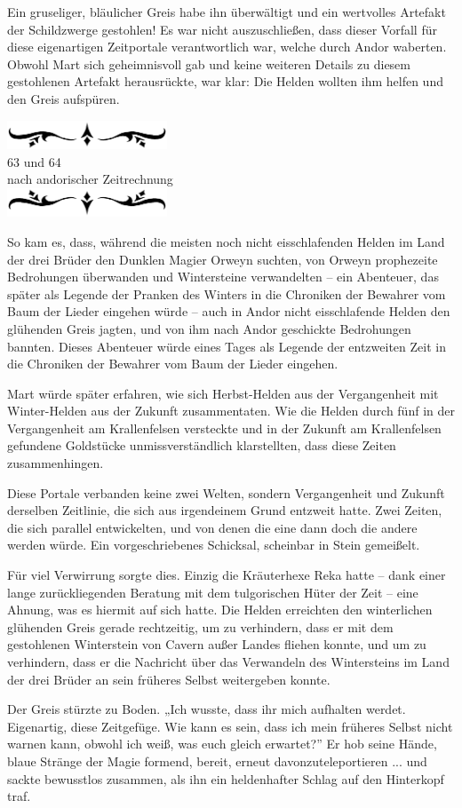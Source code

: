 \documentclass[10pt, a4paper, oneside]{book}
\newcommand{\az}[1]{%
    \begin{center}
        \includegraphics[width=180px]{Das Erbe des Wunderkindes/verzierung1.png}\\
        {\Huge #1} \\
        {nach andorischer Zeitrechnung}\\
        \includegraphics[width=180px]{Das Erbe des Wunderkindes/verzierung2.png}
    \end{center}
    \extramarks{}{#1 a.Z.}
}
\begin{document}
Ein gruseliger, bläulicher Greis habe ihn überwältigt und ein wertvolles Artefakt der Schildzwerge gestohlen! Es war nicht auszuschließen, dass dieser Vorfall für diese eigenartigen Zeitportale verantwortlich war, welche durch Andor waberten. Obwohl Mart sich geheimnisvoll gab und keine weiteren Details zu diesem gestohlenen Artefakt herausrückte, war klar: Die Helden wollten ihm helfen und den Greis aufspüren. 

\az{63 und 64}

So kam es, dass, während die meisten noch nicht eisschlafenden Helden im Land der drei Brüder den Dunklen Magier Orweyn suchten, von Orweyn prophezeite Bedrohungen überwanden und Wintersteine verwandelten – ein Abenteuer, das später als Legende der Pranken des Winters in die Chroniken der Bewahrer vom Baum der Lieder eingehen würde – auch in Andor nicht eisschlafende Helden den glühenden Greis jagten, und von ihm nach Andor geschickte Bedrohungen bannten. Dieses Abenteuer würde eines Tages als Legende der entzweiten Zeit in die Chroniken der Bewahrer vom Baum der Lieder eingehen. 

Mart würde später erfahren, wie sich Herbst-Helden aus der Vergangenheit mit Winter-Helden aus der Zukunft zusammentaten. Wie die Helden durch fünf in der Vergangenheit am Krallenfelsen versteckte und in der Zukunft am Krallenfelsen gefundene Goldstücke unmissverständlich klarstellten, dass diese Zeiten zusammenhingen. 

Diese Portale verbanden keine zwei Welten, sondern Vergangenheit und Zukunft derselben Zeitlinie, die sich aus irgendeinem Grund entzweit hatte. Zwei Zeiten, die sich parallel entwickelten, und von denen die eine dann doch die andere werden würde. Ein vorgeschriebenes Schicksal, scheinbar in Stein gemeißelt.

Für viel Verwirrung sorgte dies. Einzig die Kräuterhexe Reka hatte – dank einer lange zurückliegenden Beratung mit dem tulgorischen Hüter der Zeit – eine Ahnung, was es hiermit auf sich hatte. Die Helden erreichten den winterlichen glühenden Greis gerade rechtzeitig, um zu verhindern, dass er mit dem gestohlenen Winterstein von Cavern außer Landes fliehen konnte, und um zu verhindern, dass er die Nachricht über das Verwandeln des Wintersteins im Land der drei Brüder an sein früheres Selbst weitergeben konnte.\bigskip

Der Greis stürzte zu Boden. „Ich wusste, dass ihr mich aufhalten werdet. Eigenartig, diese Zeitgefüge. Wie kann es sein, dass ich mein früheres Selbst nicht warnen kann, obwohl ich weiß, was euch gleich erwartet?” Er hob seine Hände, blaue Stränge der Magie formend, bereit, erneut davonzuteleportieren ... und sackte bewusstlos zusammen, als ihn ein heldenhafter Schlag auf den Hinterkopf traf.\bigskip
\end{document}
